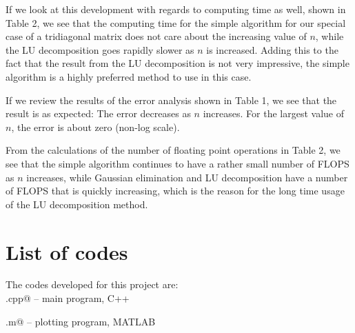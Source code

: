 \documentclass{article}
\begin{document}
\begin{multicols}{2}
If we look at this development with regards to computing time as well, shown in Table 2, we see that the computing time for the simple algorithm for our special case of a tridiagonal matrix does not care about the increasing value of $n$, while the LU decomposition goes rapidly slower as $n$ is increased. Adding this to the fact that the result from the LU decomposition is not very impressive, the simple algorithm is a highly preferred method to use in this case.

If we review the results of the error analysis shown in Table 1, we see that the result is as expected: The error decreases as $n$ increases. For the largest value of $n$, the error is about zero (non-log scale).

From the calculations of the number of floating point operations in Table 2, we see that the simple algorithm continues to have a rather small number of FLOPS as $n$ increases, while Gaussian elimination and LU decomposition have a number of FLOPS that is quickly increasing, which is the reason for the long time usage of the LU decomposition method. 


\section{List of codes}

The codes developed for this project are:\\

\noindent \verb@main.cpp@ -- main program, C++

\noindent \verb@plotting.m@ -- plotting program, MATLAB
\end{multicols}
\end{document}
